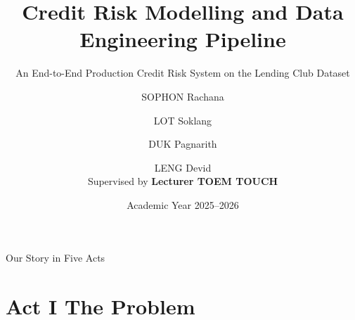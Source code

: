 \documentclass[aspectratio=169,11pt]{beamer}
\title[Credit Risk Modelling \& Data Engineering]{Credit Risk Modelling and Data Engineering Pipeline}
\subtitle{An End-to-End Production Credit Risk System on the Lending Club Dataset}
\author[Rachana \textbar\ Soklang \textbar\ Pagnarith \textbar\ Devid]{%
  SOPHON Rachana \and LOT Soklang \and DUK Pagnarith \and LENG Devid\\[3pt]
  {\small Supervised by \textbf{Lecturer TOEM TOUCH}}%
}
\institute[ITC]{Institute of Technology of Cambodia --- Department of Information Technology}
\date{Academic Year 2025--2026}
\begin{document}

\begin{frame}[plain]
  \titlepage
\end{frame}

\begin{frame}{Our Story in Five Acts}
  \tableofcontents[hideallsubsections]
\end{frame}

\section{Act I \textemdash{} The Problem}
\end{document}
